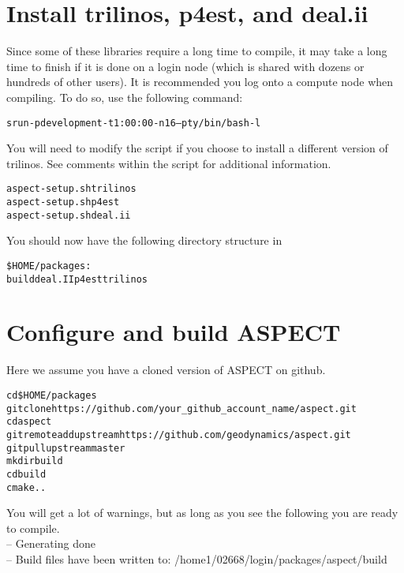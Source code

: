 \documentclass[12pt]{article}
\begin{document}
 \section{Install trilinos, p4est, and deal.ii}
 
Since some of these libraries require a long time to compile, it may take a long time to
finish if it is done on a login node (which is shared with dozens or hundreds of other users).
It is recommended you log onto a compute node when compiling. To do so, use the following
command: \\

\begin{alltt}\footnotesize
srun -p development -t 1:00:00 -n 16 --pty /bin/bash -l
\end{alltt}


You will need to modify the script if you choose to install a different version of trilinos.  See comments within the script for additional information.\\
 
 \begin{alltt}\footnotesize
 aspect-setup.sh trilinos \\
 aspect-setup.sh p4est \\
 aspect-setup.sh deal.ii    \\
 \end{alltt}
 
 You should now have the following directory structure in  \begin{alltt}\footnotesize \$HOME/packages:  \\
  
  build  deal.II  p4est  trilinos
\end{alltt}

 \section{Configure and build ASPECT}
 Here we assume you have a cloned version of ASPECT on github.  
 \begin{alltt}\footnotesize
 cd \$HOME/packages 
 git clone https://github.com/your\_github\_account\_name/aspect.git 
 cd aspect 
 git remote add upstream https://github.com/geodynamics/aspect.git 
 git pull upstream master  
 mkdir build 
 cd build 
 cmake ..  
 \end{alltt}

You will get a lot of warnings, but as long as you see the following you are ready to compile. \\
-- Generating done \\
-- Build files have been written to: /home1/02668/login/packages/aspect/build \\
\end{document}
